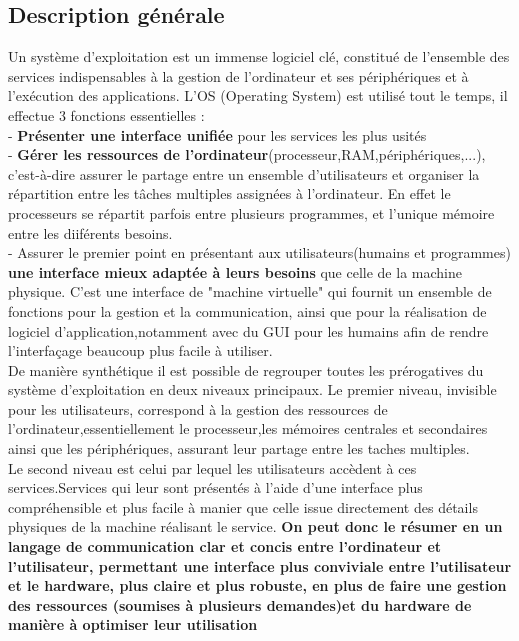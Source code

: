 \documentclass{report}
\begin{document}
\subsection{Description générale}
Un système d'exploitation est un immense logiciel clé, constitué de l'ensemble des services indispensables à la gestion de l'ordinateur et ses périphériques et à l'exécution des applications.
L'OS (Operating System) est utilisé tout le temps, il effectue 3 fonctions essentielles :\\
- {\bf Présenter une interface unifiée} pour les services les plus usités\\
- {\bf Gérer les ressources de l'ordinateur}(processeur,RAM,périphériques,...), c'est-à-dire assurer le partage entre un ensemble d'utilisateurs et organiser la répartition entre les tâches multiples assignées à l'ordinateur. En effet le processeurs se répartit parfois entre plusieurs programmes, et l'unique mémoire entre les diiférents besoins.\\
- Assurer le premier point en présentant aux utilisateurs(humains et programmes) {\bf une interface mieux adaptée à leurs besoins} que celle de la machine physique. C'est une interface de "machine virtuelle" qui fournit un ensemble de fonctions pour la gestion et la communication, ainsi que pour la réalisation de logiciel d'application,notamment avec du GUI pour les humains afin de rendre l'interfaçage beaucoup plus facile à utiliser.\\
De manière synthétique il est possible de regrouper toutes les prérogatives du système d'exploitation en deux niveaux principaux. 
Le premier niveau, invisible pour les utilisateurs, correspond à la gestion des ressources de l'ordinateur,essentiellement le processeur,les mémoires centrales et secondaires ainsi que les périphériques, assurant leur partage entre les taches multiples.\\
Le second niveau est celui par lequel les utilisateurs accèdent à ces services.Services qui leur sont présentés à l'aide d'une interface plus compréhensible et plus facile à manier que celle issue directement des détails physiques de la machine réalisant le service.
{\bf On peut donc le résumer en un langage de communication clar et concis entre l'ordinateur et l'utilisateur, permettant une interface plus conviviale entre l'utilisateur et le hardware, plus claire et plus robuste, en plus de faire une gestion des ressources (soumises à plusieurs demandes)et du hardware de manière à optimiser leur utilisation}\\
\end{document}
